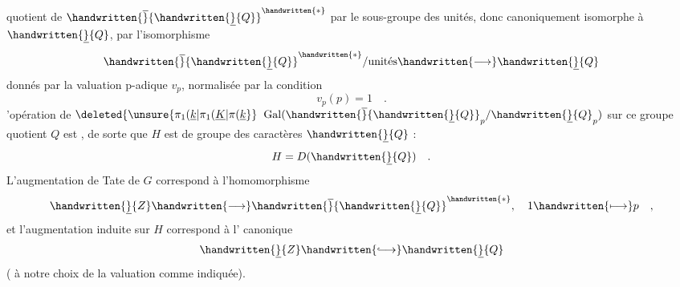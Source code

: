 quotient de $\handwritten{\overline}{\handwritten{\underline}{Q}}^{\handwritten{*}}$ par le sous-groupe des unités, donc canoniquement isomorphe à $\handwritten{\underline}{Q}$, par l'isomorphisme
\[
\handwritten{\overline}{\handwritten{\underline}{Q}}^{\handwritten{*}}/\text{unités}\handwritten{\longrightarrow}\handwritten{\underline}{Q}
\]
donnés par la valuation p-adique $v_p$, normalisée par la condition
\[
v_p(p)=1\quad .
\]
'opération de $\deleted{\unsure{\pi_1(\underline{k}|\pi_1(\underline{K}|\pi(\underline{k}}}$ $\operatorname{Gal}(\handwritten{\overline}{\handwritten{\underline}{Q}}_p/\handwritten{\underline}{Q}_p)$ sur ce groupe quotient $Q$ est , de sorte que $H$ est  de groupe des caractères $\handwritten{\underline}{Q}$ :
\[
H=D(\handwritten{\underline}{Q})\quad .
\]
L'augmentation de Tate de $G$ correspond à l'homomorphisme
\[
\handwritten{\underline}{Z}\handwritten{\longrightarrow}\handwritten{\overline}{\handwritten{\underline}{Q}}^{\handwritten{*}},\quad 1\handwritten{\longmapsto}p\quad ,
\]
et l'augmentation induite sur $H$ correspond à l' canonique
\[
\handwritten{\underline}{Z}\handwritten{\lhook\joinrel\longrightarrow}\handwritten{\underline}{Q}
\]
( à notre choix de la valuation  comme indiquée).

